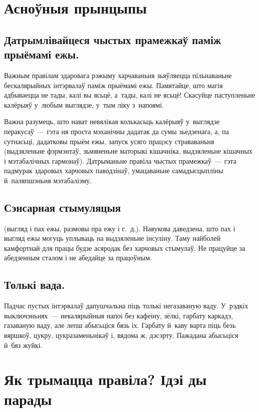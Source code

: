\section{Асноўныя прынцыпы}

\subsection{Датрымлівайцеся чыстых прамежкаў паміж прыёмамі ежы.}

Важным правілам здаровага рэжыму харчаваньня зьяўляецца пільнаваньне бескалярыйных інтэрвалаў паміж прыёмамі ежы. Памятайце, што магія адбываецца не тады, калі вы ясьцё, а~тады, калі не ясьцё! Скасуйце паступленьне калёрыяў у~любым выглядзе, у~тым ліку з~напоямі.

Важна разумець, што нават невялікая колькасьць калёрыяў у~выглядзе перакусаў~--- гэта ня проста мэханічны дадатак да сумы зьедзенага, а, па сутнасьці, дадатковы прыём ежы, запуск усяго працэсу страваваньня (выдзяленьне фэрмэнтаў, зьмяненьне маторыкі кішачніка, выдзяленьне кішачных і мэтабалічных гармонаў). Датрыманьне правіла чыстых прамежкаў~--- гэта падмурак здаровых харчовых паводзінаў, умацаваньне самадысцыпліны й~паляпшэньня мэтабалізму.

\subsection{Сэнсарная стымуляцыя} (выгляд і пах ежы, размовы пра ежу і г.~д.). Навукова даведзена, што пах і выгляд ежы могуць уплываць на выдзяленьне інсуліну. Таму найболей камфортнай для працы будзе асяродак без харчовых стымулаў. Не працуйце за абедзенным сталом і не абедайце за працоўным.

\subsection{Толькі вада.}

Падчас пустых інтэрвалаў дапушчальна піць толькі негазаваную ваду. У~рэдкіх выключэньнях~--- некалярыйныя напоі без кафеіну, зёлкі, гарбату каркадэ, газаваную ваду, але лепш абысьціся бязь іх. Гарбату й~каву варта піць безь вяршкоў, цукру, цукразаменьнікаў і, вядома ж, дэсэрту. Пажадана абысьціся й~бяз жуйкі.

\section{Як трымацца правіла? Ідэі ды парады}

